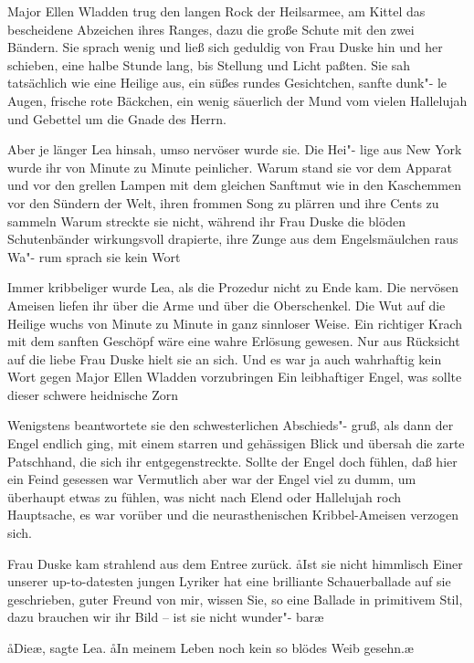 Major Ellen Wladden trug den langen Rock der Heilsarmee, am
Kittel das bescheidene Abzeichen ihres Ranges, dazu die große
Schute mit den zwei Bändern. Sie sprach wenig und ließ sich
geduldig von Frau Duske hin und her schieben, eine halbe
Stunde lang, bis Stellung und Licht paßten. Sie sah tatsächlich
wie eine Heilige aus, ein süßes rundes Gesichtchen, sanfte dunk"-%
le Augen, frische rote Bäckchen, ein wenig säuerlich der Mund
vom vielen Hallelujah und Gebettel um die Gnade des Herrn.

Aber je länger Lea hinsah, umso nervöser wurde sie. Die Hei"-%
lige aus New York wurde ihr von Minute zu Minute peinlicher.
Warum stand sie vor dem Apparat und vor den grellen
Lampen mit dem gleichen Sanftmut wie in den Kaschemmen
vor den Sündern der Welt, ihren frommen Song zu plärren
und ihre Cents zu sammeln\frag{} Warum streckte sie nicht, während
ihr Frau Duske die blöden Schutenbänder wirkungsvoll
drapierte, ihre Zunge aus dem Engelsmäulchen raus\frag{} Wa"-%
rum sprach sie kein Wort\frag{}

Immer kribbeliger wurde Lea, als die Prozedur nicht zu Ende
kam. Die nervösen Ameisen liefen ihr über die Arme und über
die Oberschenkel. Die Wut auf die Heilige wuchs von Minute
zu Minute in ganz sinnloser Weise. Ein richtiger Krach mit
dem sanften Geschöpf wäre eine wahre Erlösung gewesen.
Nur aus Rücksicht auf die liebe Frau Duske hielt sie an sich.
Und es war ja auch wahrhaftig kein Wort gegen Major Ellen
Wladden vorzubringen\frag{} Ein leibhaftiger Engel, was sollte
dieser schwere heidnische Zorn\frag{}

Wenigstens beantwortete sie den schwesterlichen Abschieds"-%
gruß, als dann der Engel endlich ging, mit einem starren und
gehässigen Blick und übersah die zarte Patschhand, die sich ihr
entgegenstreckte. Sollte der Engel doch fühlen, daß hier ein
Feind gesessen war\ausr{} Vermutlich aber war der Engel viel zu
dumm, um überhaupt etwas zu fühlen, was nicht nach Elend
oder Hallelujah roch\frag{} Hauptsache, es war vorüber und die
neurasthenischen Kribbel-Ameisen verzogen sich.

Frau Duske kam strahlend aus dem Entree zurück. \aa{}Ist sie
nicht himmlisch\frag{} Einer unserer up-to-datesten jungen Lyriker
hat eine brilliante Schauerballade auf sie geschrieben, guter
Freund von mir, wissen Sie, so eine Ballade in primitivem
Stil, dazu brauchen wir ihr Bild -- ist sie nicht wunder"-%
bar\frag{}\ae{}

\aa{}Die\frag{}\ae{}, sagte Lea. \aa{}In meinem Leben noch kein so blödes
Weib gesehn.\ae{}

